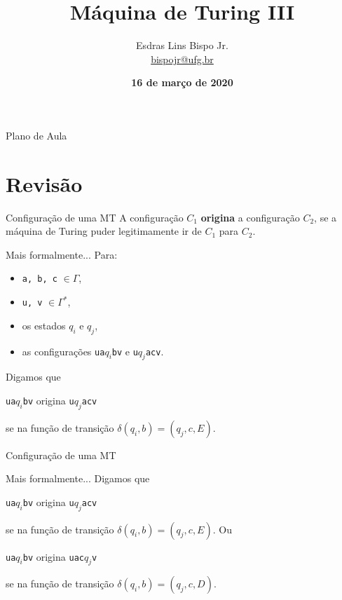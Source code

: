 \documentclass[xcolor=dvipsnames,table]{beamer}
\title{Máquina de Turing III}
\author{
  Esdras Lins Bispo Jr. \\ \url{bispojr@ufg.br}
  }
\institute{
  Teoria da Computação \\Bacharelado em Ciência da Computação}
\date{\textbf{16 de março de 2020} }
\begin{document}
	\begin{frame}
		\titlepage
	\end{frame}

	\AtBeginSection{
		\begin{frame}{Sumário}%
    		\tableofcontents[currentsection]
		\end{frame}
	}

	\begin{frame}{Plano de Aula}
		\tableofcontents
	\end{frame}

	\section{Revisão}	
	\begin{frame}{Configuração de uma MT}
		A configuração $C_1$ {\bf origina} a configuração $C_2$, se a máquina de Turing puder legitimamente ir de $C_1$ para $C_2$.
		\begin{block}{Mais formalmente...}					Para:
			\begin{itemize}
				\item {\tt a, b, c} $\in \Gamma$,
				\item {\tt u, v} $\in \Gamma^*$, 
				\item os estados $q_i$ e $q_j$, 
				\item as configurações {\tt ua}$q_i${\tt bv} e {\tt u}$q_j${\tt acv}.
				\end{itemize}
			 	
			Digamos que 
			\begin{center}
				{\tt ua}$q_i${\tt bv} origina {\tt u}$q_j${\tt acv} 
			\end{center} 
			se na função de transição $\delta(q_i, b) = (q_j, c, E)$.
		\end{block}
	\end{frame}
	
	\begin{frame}{Configuração de uma MT}
		\begin{block}{Mais formalmente...}
			Digamos que 
			\begin{center}
				{\tt ua}$q_i${\tt bv} origina {\tt u}$q_j${\tt acv} 
			\end{center} 
			se na função de transição $\delta(q_i, b) = (q_j, c, E)$. Ou
			\begin{center}
				{\tt ua}$q_i${\tt bv} origina {\tt uac}$q_j${\tt v} 
			\end{center} 
			se na função de transição $\delta(q_i, b) = (q_j, c, D)$.
		\end{block}
	\end{frame}
	
\end{document}
